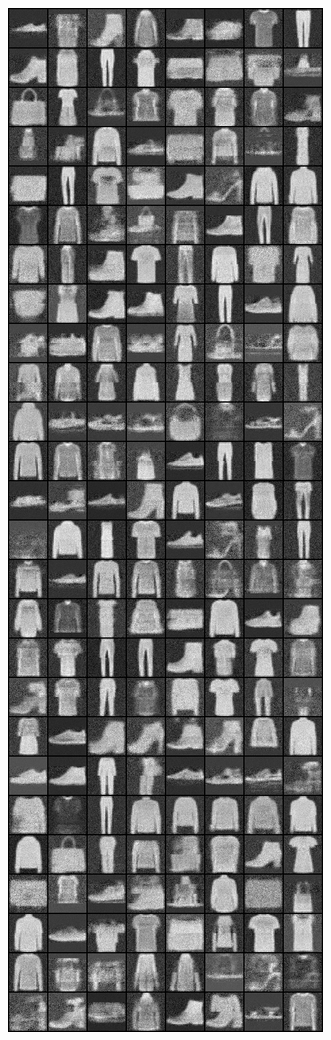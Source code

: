 \begin{figure}
\includegraphics[width=\picwidth\columnwidth]{figures/supplementary/alternative_fmnist/image_10000.png}

\end{figure}
